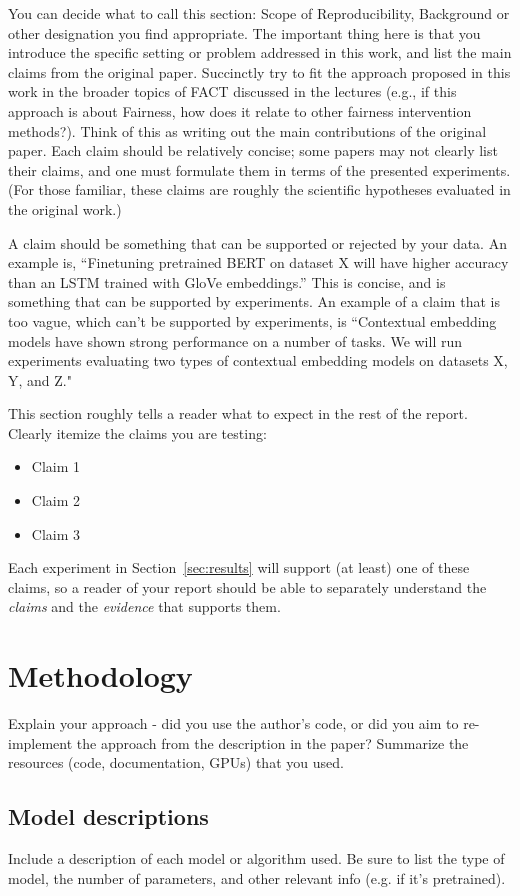 \documentclass[10pt]{article} %
\begin{document}
	You can decide what to call this section: Scope of Reproducibility, Background or other designation you find appropriate. The important thing here is that you introduce the specific setting or problem addressed in this work, and list the main claims from the original paper. Succinctly try to fit the approach proposed in this work in the broader topics of FACT discussed in the lectures (e.g., if this approach is about Fairness, how does it relate to other fairness intervention methods?). Think of this as writing out the main contributions of the original paper. Each claim should be relatively concise; some papers may not clearly list their claims, and one must formulate them in terms of the presented experiments. (For those familiar, these claims are roughly the scientific hypotheses evaluated in the original work.)
	
	A claim should be something that can be supported or rejected by your data. An example is, ``Finetuning pretrained BERT on dataset X will have higher accuracy than an LSTM trained with GloVe embeddings.''
	This is concise, and is something that can be supported by experiments.
	An example of a claim that is too vague, which can't be supported by experiments, is ``Contextual embedding models have shown strong performance on a number of tasks. We will run experiments evaluating two types of contextual embedding models on datasets X, Y, and Z."
	
	This section roughly tells a reader what to expect in the rest of the report. Clearly itemize the claims you are testing:
	\begin{itemize}
		\item Claim 1
		\item Claim 2
		\item Claim 3
	\end{itemize}
	
	Each experiment in Section~\ref{sec:results} will support (at least) one of these claims, so a reader of your report should be able to separately understand the \emph{claims} and the \emph{evidence} that supports them.
	
	\section{Methodology}
	Explain your approach - did you use the author's code, or did you aim to re-implement the approach from the description in the paper? Summarize the resources (code, documentation, GPUs) that you used.
	
	\subsection{Model descriptions}
	Include a description of each model or algorithm used. Be sure to list the type of model, the number of parameters, and other relevant info (e.g. if it's pretrained). 
	
\end{document}
